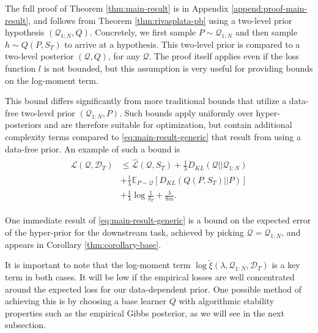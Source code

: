 \documentclass{article} %
\theoremstyle{definition}
\newcommand{\Expect}[2]{\mathbb{E}_{#1}\left [#2 \right ]}
\begin{document}
The full proof of Theorem \ref{thm:main-result} is in Appendix \ref{append:proof-main-result}, and follows from Theorem \ref{thm:rivasplata-pb} using a two-level prior hypothesis $(\mathcal{Q}_{1:N}, Q)$. Concretely, we first sample $P\sim \mathcal{Q}_{1:N}$ and then sample $h\sim Q(P, S_T)$ to arrive at a hypothesis. This two-level prior is compared to a two-level posterior $(\mathcal{Q}, Q)$, for any $\mathcal{Q}$. The proof itself applies even if the loss function $l$ is not bounded, but this assumption is very useful for providing bounds on the log-moment term.

This bound differs significantly from more traditional bounds that utilize a data-free two-level prior $(\mathcal{Q}_{1:N}, P)$. Such bounds apply uniformly over hyper-posteriors and are therefore suitable for optimization, but contain additional complexity terms compared to \eqref{eq:main-result-generic} that result from using a data-free prior. An example of such a bound is
%
\begin{align} \label{eq:main-result-generic-datafree}
\begin{split}
\mathcal{L}(\mathcal{Q}, \mathcal{D}_T) &\leq \hat{\mathcal{L}}(\mathcal{Q}, S_T) 
+ \frac{1}{\lambda}D_{KL}(\mathcal{Q}||\mathcal{Q}_{1:N}) \\
&+ \frac{1}{\lambda}\Expect{P\sim \mathcal{Q}}{D_{KL}(Q(P,S_T)||P)}\\
&+\frac{1}{\lambda}\log\frac{1}{\delta_T}+\frac{\lambda}{8m} .
\end{split}
\end{align}


One immediate result of \eqref{eq:main-result-generic} is a bound on the expected error of the hyper-prior for the downstream task, achieved by picking $\mathcal{Q}=\mathcal{Q}_{1:N}$, and appears in Corollary \ref{thm:corollary-base}.

It is important to note that the log-moment term $\log\tilde{\xi}(\lambda,\mathcal{Q}_{1:N},\mathcal{D}_T)$ is a key term in both cases. It will be low if the empirical losses are well concentrated around the expected loss for our data-dependent prior. One possible method of achieving this is by choosing a base learner $Q$ with algorithmic stability properties such as the empirical Gibbs posterior, as we will see in the next subsection.
\end{document}
